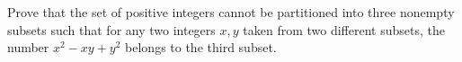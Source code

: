 Prove that the set of positive integers cannot be partitioned into three nonempty subsets such that for any two integers $x, y$ taken from two different subsets, the number $x^2 - xy + y^2$ belongs to the third subset.
